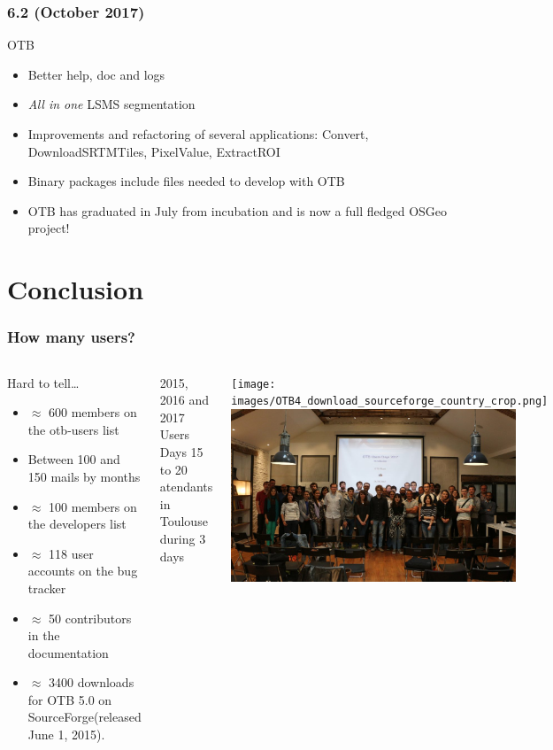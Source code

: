 \documentclass[8pt]{beamer}
\begin{document}
\begin{frame}
  \frametitle{6.2 (October 2017)}
  \begin{block}{OTB}
    \begin{itemize}
      \item Better help, doc and logs
      \item \textit{All in one} LSMS segmentation
      \item Improvements and refactoring of several applications: Convert, DownloadSRTMTiles, PixelValue, ExtractROI
      \item Binary packages include files needed to develop with OTB
      \item OTB has graduated in July from incubation and is now a full fledged OSGeo project!
    \end{itemize}
    \end{block}
\end{frame}

\section{Conclusion}
\begin{frame}
\frametitle{How many users?}
\begin{columns}[c]
\begin{block}{Hard to tell\ldots}
\begin{itemize}
    \item $\approx$ 600 members on the otb-users list
    \item Between 100 and 150 mails by months
    \item $\approx$ 100 members on the developers list
    \item $\approx$ 118 user accounts on the bug tracker
    \item $\approx$ 50 contributors in the documentation
    \item $\approx$ 3400 downloads for OTB 5.0 on SourceForge(released June 1, 2015).
  \end{itemize}
\end{block}
\begin{block}{2015, 2016 and 2017 Users Days}
  15 to 20 atendants in Toulouse during 3 days
\end{block}
\texttt{[image: images/OTB4\_download\_sourceforge\_country\_crop.png]}\\
\includegraphics[width=0.9\textwidth]{images/userdays2017.jpg}
\end{columns}
\end{frame}
\end{document}
